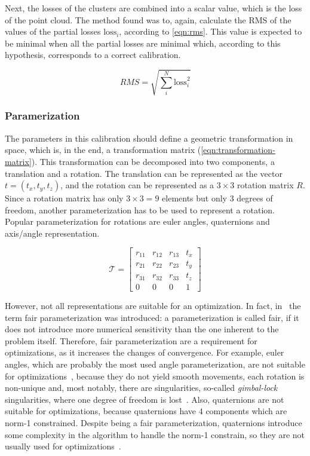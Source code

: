 Next, the losses of the clusters are combined into a scalar value, which is the loss of the point cloud. The method found was to, again, calculate the RMS of the values of the partial losses $\textrm{loss}_i$, according to \cref{eqn:rms}. This value is expected to be minimal when all the partial losses are minimal which, according to this hypothesis, corresponds to a correct calibration.

\begin{equation}
    \label{eqn:rms}
    RMS = \sqrt{\sum_{i}^{N}{\textrm{loss}_i^2}}
\end{equation}

\subsubsection{Paramerization}

The parameters in this calibration should define a geometric transformation in space, which is, in the end, a transformation matrix (\cref{eqn:transformation-matrix}). This transformation can be decomposed into two components, a translation and a rotation. The translation can be represented as the vector $t = (t_x, t_y, t_z)$, and the rotation can be represented as a $3 \times 3$ rotation matrix $R$. Since a rotation matrix has only $3 \times 3 = 9$ elements but only 3 degrees of freedom, another parameterization has to be used to represent a rotation. Popular parameterization for rotations are euler angles, quaternions and axis/angle representation. 

\begin{equation}
    \label{eqn:transformation-matrix}
    \mathcal{T} = \left[
        \begin{array}{cccc}
            r_{11} & r_{12} & r_{13} & t_x \\
            r_{21} & r_{22} & r_{23} & t_y \\
            r_{31} & r_{32} & r_{33} & t_z \\
            0      & 0      & 0      & 1   
        \end{array}
    \right]
\end{equation}

However, not all representations are suitable for an optimization. In fact, in~\cite{hornegger99} the term fair parameterization was introduced: a parameterization is called fair, if it does not introduce more numerical sensitivity than the one inherent to the problem itself. Therefore, fair parameterization are a requirement for optimizations, as it increases the changes of convergence. For example, euler angles, which are probably the most used angle parameterization, are not suitable for optimizations~\cite{schmidt01}, because they do not yield smooth movements, each rotation is non-unique and, most notably, there are singularities, so-called \textit{gimbal-lock} singularities, where one degree of freedom is lost~\cite{schmidt01}. Also, quaternions are not suitable for optimizations, because quaternions have $4$ components which are norm-1 constrained. Despite being a fair parameterization, quaternions introduce some complexity in the algorithm to handle the norm-1 constrain, so they are not usually used for optimizations~\cite{schmidt01}.

